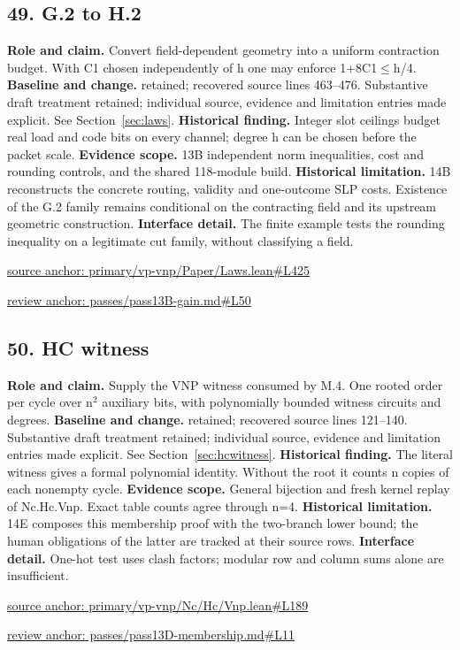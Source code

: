 \documentclass[11pt,letterpaper]{article}
\theoremstyle{definition}\newtheorem{definition}[theorem]{Definition}\newtheorem{example}[theorem]{Example}
\theoremstyle{remark}\newtheorem{remark}[theorem]{Remark}
\begin{document}
\subsection*{49. G.2 to H.2}
\textbf{Role and claim.} Convert field-dependent geometry into a uniform contraction budget. With C1 chosen independently of h one may enforce 1+8C1\ensuremath{\le}h/4.
\textbf{Baseline and change.} retained; recovered source lines 463--476. Substantive draft treatment retained; individual source, evidence and limitation entries made explicit. See Section~\ref{sec:laws}.
\textbf{Historical finding.} Integer slot ceilings budget real load and code bits on every channel; degree h can be chosen before the packet scale.
\textbf{Evidence scope.} 13B independent norm inequalities, cost and rounding controls, and the shared 118-module build.
\textbf{Historical limitation.} 14B reconstructs the concrete routing, validity and one-outcome SLP costs. Existence of the G.2 family remains conditional on the contracting field and its upstream geometric construction.
\textbf{Interface detail.} The finite example tests the rounding inequality on a legitimate cut family, without classifying a field.
\par\href{https://github.com/nousentllc/VP-VNP-Review/blob/8a7976933b6b2b4ffda1ad3a0dfb5fc6b6f023e8/primary/vp-vnp/Paper/Laws.lean\#L425}{source anchor: primary/vp-vnp/Paper/Laws.lean\#L425}
\par\href{https://github.com/nousentllc/VP-VNP-Review/blob/8a7976933b6b2b4ffda1ad3a0dfb5fc6b6f023e8/passes/pass13B-gain.md\#L50}{review anchor: passes/pass13B-gain.md\#L50}
\goodbreak
\subsection*{50. HC witness}
\textbf{Role and claim.} Supply the VNP witness consumed by M.4. One rooted order per cycle over n\ensuremath{{}^2} auxiliary bits, with polynomially bounded witness circuits and degrees.
\textbf{Baseline and change.} retained; recovered source lines 121--140. Substantive draft treatment retained; individual source, evidence and limitation entries made explicit. See Section~\ref{sec:hcwitness}.
\textbf{Historical finding.} The literal witness gives a formal polynomial identity. Without the root it counts n copies of each nonempty cycle.
\textbf{Evidence scope.} General bijection and fresh kernel replay of Nc.Hc.Vnp. Exact table counts agree through n=4.
\textbf{Historical limitation.} 14E composes this membership proof with the two-branch lower bound; the human obligations of the latter are tracked at their source rows.
\textbf{Interface detail.} One-hot test uses clash factors; modular row and column sums alone are insufficient.
\par\href{https://github.com/nousentllc/VP-VNP-Review/blob/8a7976933b6b2b4ffda1ad3a0dfb5fc6b6f023e8/primary/vp-vnp/Nc/Hc/Vnp.lean\#L189}{source anchor: primary/vp-vnp/Nc/Hc/Vnp.lean\#L189}
\par\href{https://github.com/nousentllc/VP-VNP-Review/blob/8a7976933b6b2b4ffda1ad3a0dfb5fc6b6f023e8/passes/pass13D-membership.md\#L11}{review anchor: passes/pass13D-membership.md\#L11}
\goodbreak
\end{document}
